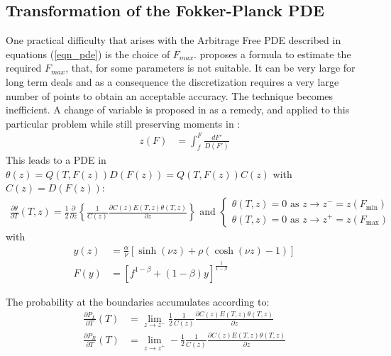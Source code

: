 \documentclass[]{rAMF2e}
\begin{document}
\subsection{Transformation of the Fokker-Planck PDE}
One practical difficulty that arises with the Arbitrage Free PDE described in equations (\ref{eqn_pde}) is the choice of $F_{max}$. \citet{hagan2013arbitrage} proposes a formula to estimate the required $F_{max}$, that, for some parameters is not suitable. It can be very large for long term deals and as a consequence the discretization requires a very large number of points to obtain an acceptable accuracy. The technique becomes inefficient. A change of variable is proposed in \citep[p. 292 section 7.4]{andersen2010interest} as a remedy, and applied to this particular problem while still preserving moments in \citep{hagan2013change}:
\begin{align}\label{eqn-variable-transform}
z(F) &= \int_{f}^F \frac{dF'}{D(F')}
\end{align}
This leads to a PDE in $\theta(z) = Q(T,F(z))D(F(z)) = Q(T,F(z))C(z)$ with $C(z) = D(F(z))$:
\begin{align}\label{eqn-transform-pde}
\frac{\partial \theta}{\partial T}(T,z) = \frac{1}{2} \frac{\partial}{\partial z} \left\lbrace \frac{1}{C(z)} \frac{\partial C(z)E(T,z)\theta(T,z)}{\partial z} \right\rbrace
 \text{ and } \begin{cases}
\theta(T,z) = 0 \text{ as } z \to z^{-}=z(F_{\min})\\
\theta(T,z) = 0 \text{ as } z \to z^{+}=z(F_{\max})
\end{cases}
\end{align}
with \begin{align}
\label{eqn-y(z)}
y(z) &= \frac{\alpha}{\nu}\left[ \sinh(\nu z) + \rho (\cosh(\nu z) - 1) \right]\\ 
\label{eqn-F(z)}
F(y) &= \left[ f^{1-\beta} + (1-\beta)y \right]^{\frac{1}{1-\beta}}
\end{align}

The probability at the boundaries accumulates according to:
\begin{align}\label{eqn-transform-boundary}
\frac{\partial P_L}{\partial T}(T) &= \lim_{z \to z^{-}} \frac{1}{2} \frac{1}{C(z)} \frac{\partial C(z)E(T,z)\theta(T,z)}{\partial z}\\
\frac{\partial P_R}{\partial T}(T) &= \lim_{z \to z^{+}}  -\frac{1}{2} \frac{1}{C(z)} \frac{\partial C(z)E(T,z)\theta(T,z)}{\partial z}
\end{align}
\end{document}

